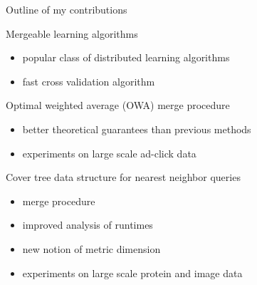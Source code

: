 \newcommand{\new}{(new)}

\begin{frame}{Outline of my contributions}

Mergeable learning algorithms
\begin{itemize}
    \item popular class of distributed learning algorithms
    \item fast cross validation algorithm
\end{itemize}

\vspace{0.1in}
Optimal weighted average (OWA) merge procedure
\begin{itemize}
    \item better theoretical guarantees than previous methods
    \item experiments on large scale ad-click data
\end{itemize}

\vspace{0.1in}
Cover tree data structure for nearest neighbor queries
\begin{itemize}
    \item merge procedure
    \item improved analysis of runtimes
    \item new notion of metric dimension 
    \item experiments on large scale protein and image data
\end{itemize}



\end{frame}

